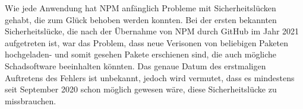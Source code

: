 Wie jede Anwendung hat NPM anfänglich Probleme mit Sicherheitslücken gehabt, die zum Glück behoben werden konnten. Bei der ersten bekannten Sicherheitslücke, die nach der Übernahme von NPM durch GitHub im Jahr 2021 aufgetreten ist, war das Problem, dass neue Verisonen von beliebigen Paketen hochgeladen- und somit gesehen Pakete erschienen sind, die auch mögliche Schadsoftware beeinhalten könnten. Das genaue Datum des erstmaligen Auftretens des Fehlers ist unbekannt, jedoch wird vermutet, dass es mindestens seit September 2020 schon möglich gewesen wäre, diese Sicherheitslücke zu missbrauchen. \cite{NPMSecurity}



